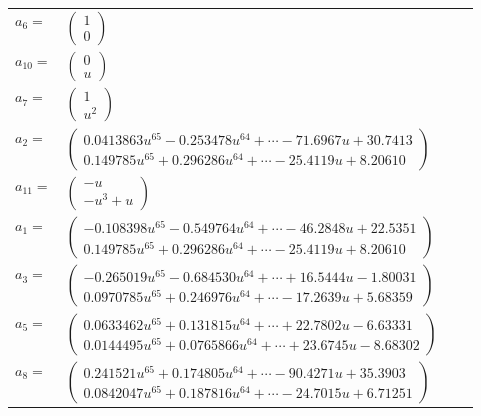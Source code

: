 \documentclass[1p]{elsarticle_modified}
\theoremstyle{definition}
\begin{document}
\begin{tabular}{m{7pt} m{180pt} m{7pt} m{180pt} }
\flushright $a_{6}=$&$\begin{pmatrix}1\\0\end{pmatrix}$ \\
\flushright $a_{10}=$&$\begin{pmatrix}0\\u\end{pmatrix}$ \\
\flushright $a_{7}=$&$\begin{pmatrix}1\\u^2\end{pmatrix}$ \\
\flushright $a_{2}=$&$\begin{pmatrix}0.0413863 u^{65}-0.253478 u^{64}+\cdots-71.6967 u+30.7413\\0.149785 u^{65}+0.296286 u^{64}+\cdots-25.4119 u+8.20610\end{pmatrix}$ \\
\flushright $a_{11}=$&$\begin{pmatrix}- u\\- u^3+u\end{pmatrix}$ \\
\flushright $a_{1}=$&$\begin{pmatrix}-0.108398 u^{65}-0.549764 u^{64}+\cdots-46.2848 u+22.5351\\0.149785 u^{65}+0.296286 u^{64}+\cdots-25.4119 u+8.20610\end{pmatrix}$ \\
\flushright $a_{3}=$&$\begin{pmatrix}-0.265019 u^{65}-0.684530 u^{64}+\cdots+16.5444 u-1.80031\\0.0970785 u^{65}+0.246976 u^{64}+\cdots-17.2639 u+5.68359\end{pmatrix}$ \\
\flushright $a_{5}=$&$\begin{pmatrix}0.0633462 u^{65}+0.131815 u^{64}+\cdots+22.7802 u-6.63331\\0.0144495 u^{65}+0.0765866 u^{64}+\cdots+23.6745 u-8.68302\end{pmatrix}$ \\
\flushright $a_{8}=$&$\begin{pmatrix}0.241521 u^{65}+0.174805 u^{64}+\cdots-90.4271 u+35.3903\\0.0842047 u^{65}+0.187816 u^{64}+\cdots-24.7015 u+6.71251\end{pmatrix}$ \\

\end{tabular}
\end{document}
